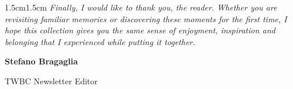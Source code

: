 \begin{adjustwidth}{1.5cm}{1.5cm}
    \null
    \textit{Finally, I would like to thank you, the reader.}
    \textit{Whether you are revisiting familiar memories or discovering these moments for the first time, I hope this collection gives you the same sense of enjoyment, inspiration and belonging that I experienced while putting it together.}

    \null
    \hfill \textbf{Stefano Bragaglia}

    \hfill TWBC Newsletter Editor
\end{adjustwidth}
